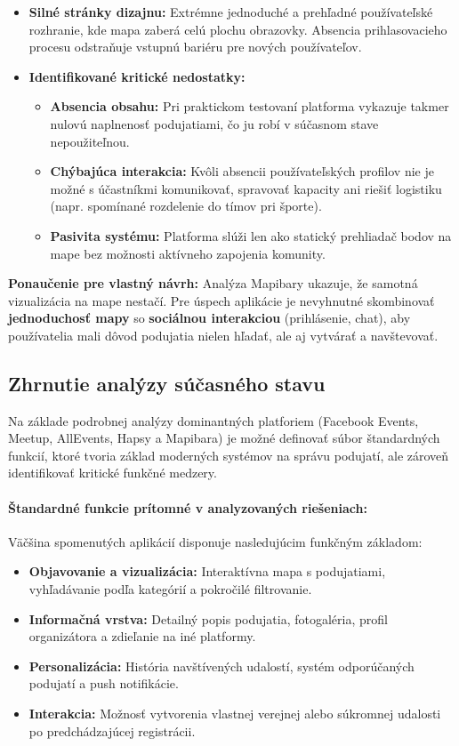 \begin{itemize}[noitemsep]
    \item \textbf{Silné stránky dizajnu:} Extrémne jednoduché a prehľadné používateľské rozhranie, kde mapa zaberá celú plochu obrazovky. 
    Absencia prihlasovacieho procesu odstraňuje vstupnú bariéru pre nových používateľov.
    \item \textbf{Identifikované kritické nedostatky:} 
    \begin{itemize}
        \item \textbf{Absencia obsahu:} Pri praktickom testovaní platforma vykazuje takmer nulovú naplnenosť podujatiami, 
        čo ju robí v súčasnom stave nepoužiteľnou.
        \item \textbf{Chýbajúca interakcia:} Kvôli absencii používateľských profilov nie je možné s účastníkmi 
        komunikovať, spravovať kapacity ani riešiť logistiku (napr. spomínané rozdelenie do tímov pri športe).
        \item \textbf{Pasivita systému:} Platforma slúži len ako statický prehliadač bodov na mape bez možnosti aktívneho zapojenia komunity.
    \end{itemize}
\end{itemize}\cite{mapibara}

\noindent \textbf{Ponaučenie pre vlastný návrh:} Analýza Mapibary ukazuje, že samotná vizualizácia na mape nestačí. Pre úspech aplikácie je nevyhnutné skombinovať \textbf{jednoduchosť mapy} so \textbf{sociálnou interakciou} (prihlásenie, chat), aby používatelia mali dôvod podujatia nielen hľadať, ale aj vytvárať a navštevovať.

\subsection{Zhrnutie analýzy súčasného stavu}

Na základe podrobnej analýzy dominantných platforiem (Facebook Events, Meetup, AllEvents, Hapsy a Mapibara) je možné definovať súbor štandardných funkcií, ktoré tvoria základ moderných systémov na správu podujatí, ale zároveň identifikovať kritické funkčné medzery.

\paragraph{Štandardné funkcie prítomné v analyzovaných riešeniach:}
Väčšina spomenutých aplikácií disponuje nasledujúcim funkčným základom:
\begin{itemize}[noitemsep]
    \item \textbf{Objavovanie a vizualizácia:} Interaktívna mapa s podujatiami, vyhľadávanie podľa kategórií a pokročilé filtrovanie.
    \item \textbf{Informačná vrstva:} Detailný popis podujatia, fotogaléria, profil organizátora a zdieľanie  na iné platformy.
    \item \textbf{Personalizácia:} História navštívených udalostí, systém odporúčaných podujatí a push notifikácie.
    \item \textbf{Interakcia:} Možnosť vytvorenia vlastnej verejnej alebo súkromnej udalosti po predchádzajúcej registrácii.
\end{itemize}

